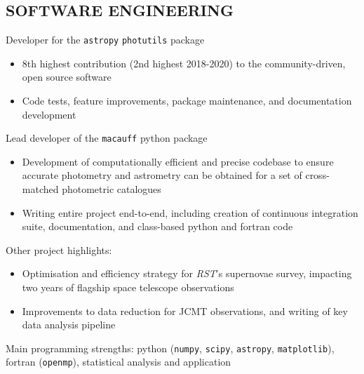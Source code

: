 \documentclass[letter, margin, 10pt]{res} %
\begin{document}
\begin{resume}
\vspace{-6pt}
\section{SOFTWARE ENGINEERING}

Developer for the \texttt{astropy} \texttt{photutils} package
\begin{itemize}[noitemsep,topsep=0pt,parsep=0pt,partopsep=0pt]
\item 8th highest contribution (2nd highest 2018-2020) to the community-driven, open source software
\item Code tests, feature improvements, package maintenance, and documentation development
\end{itemize}
\vspace{-10pt}
Lead developer of the \texttt{macauff} python package
\begin{itemize}[noitemsep,topsep=0pt,parsep=0pt,partopsep=0pt]
\item Development of computationally efficient and precise codebase to ensure accurate photometry and astrometry can be obtained for a set of cross-matched photometric catalogues
\item Writing entire project end-to-end, including creation of continuous integration suite, documentation, and class-based python and fortran code
\end{itemize}
\vspace{-10pt}
Other project highlights:
\begin{itemize}[noitemsep,topsep=0pt,parsep=0pt,partopsep=0pt]
\item Optimisation and efficiency strategy for \textit{RST}'s supernovae survey, impacting two years of flagship space telescope observations
\item Improvements to data reduction for JCMT observations, and writing of key data analysis pipeline
\end{itemize}
\vspace{-10pt}
Main programming strengths: python (\texttt{numpy}, \texttt{scipy}, \texttt{astropy}, \texttt{matplotlib}), fortran (\texttt{openmp}), statistical analysis and application

\parskip 5pt
\vspace{-6pt}

\end{resume}
\end{document}
